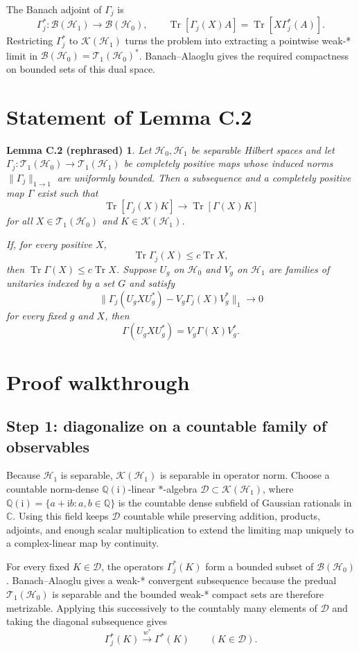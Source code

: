 \documentclass[11pt]{article}
\newcommand{\Hc}{\mathcal H}
\newcommand{\T}{\mathcal T_1}
\newcommand{\K}{\mathcal K}
\newcommand{\Bop}{\mathcal B}
\newcommand{\Tr}{\operatorname{Tr}}
\newtheorem*{lemmaC}{Lemma C.2 (rephrased)}
\begin{document}
The Banach adjoint of $\Gamma_j$ is
\[
  \Gamma_j^*:\Bop(\Hc_1)\longrightarrow\Bop(\Hc_0),
  \qquad
  \Tr[\Gamma_j(X)A]=\Tr[X\Gamma_j^*(A)].
\]
Restricting $\Gamma_j^*$ to $\K(\Hc_1)$ turns the problem into extracting a
pointwise weak-* limit in $\Bop(\Hc_0)=\T(\Hc_0)^*$.  Banach--Alaoglu gives
the required compactness on bounded sets of this dual space.

\section{Statement of Lemma C.2}

\begin{lemmaC}
Let $\Hc_0,\Hc_1$ be separable Hilbert spaces and let
$\Gamma_j:\T(\Hc_0)\to\T(\Hc_1)$ be completely positive maps whose
induced norms $\|\Gamma_j\|_{1\to1}$ are uniformly bounded.  Then a
subsequence and a completely positive map $\Gamma$ exist such that
\[
  \Tr[\Gamma_j(X)K]\longrightarrow\Tr[\Gamma(X)K]
\]
for all $X\in\T(\Hc_0)$ and $K\in\K(\Hc_1)$.

If, for every positive $X$,
\[
  \Tr\Gamma_j(X)\leq c\Tr X,
\]
then $\Tr\Gamma(X)\leq c\Tr X$.  Suppose $U_g$ on $\Hc_0$ and $V_g$ on
$\Hc_1$ are families of unitaries indexed by a set $G$ and satisfy
\[
  \|\Gamma_j(U_gXU_g^*)-V_g\Gamma_j(X)V_g^*\|_1\longrightarrow0
\]
for every fixed $g$ and $X$, then
\[
  \Gamma(U_gXU_g^*)=V_g\Gamma(X)V_g^*.
\]
\end{lemmaC}

\section{Proof walkthrough}

\subsection*{Step 1: diagonalize on a countable family of observables}

Because $\Hc_1$ is separable, $\K(\Hc_1)$ is separable in operator norm.
Choose a countable norm-dense $\mathbb Q(\mathrm i)$-linear $*$-algebra
$\mathcal D\subset\K(\Hc_1)$, where
$\mathbb Q(\mathrm i)=\{a+\mathrm ib:a,b\in\mathbb Q\}$ is the countable
dense subfield of Gaussian rationals in $\mathbb C$.  Using this field keeps
$\mathcal D$ countable while preserving addition, products, adjoints, and
enough scalar multiplication to extend the limiting map uniquely to a
complex-linear map by continuity.

For every fixed $K\in\mathcal D$, the operators $\Gamma_j^*(K)$ form a
bounded subset of $\Bop(\Hc_0)$.  Banach--Alaoglu gives a weak-* convergent
subsequence because the predual $\T(\Hc_0)$ is separable and the bounded
weak-* compact sets are therefore metrizable.  Applying this successively to
the countably many elements of $\mathcal D$ and taking the diagonal
subsequence gives
\[
  \Gamma_j^*(K)\stackrel{w^*}{\longrightarrow}\Gamma^*(K)
  \qquad(K\in\mathcal D).
\]
\end{document}
